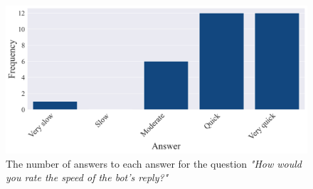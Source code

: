\begin{figure}[H]
    \centering
    \includegraphics[width=1\textwidth]{results/plots/assets/feedback-01-frequency-of-answer-for-question-cbfea1.png}
    \caption{The number of answers to each answer for the question \textit{"How would you rate the speed of the bot's reply?"}}
    \label{fig:feedback_01_frequency_of_answer_for_question_cbfea1}
\end{figure}